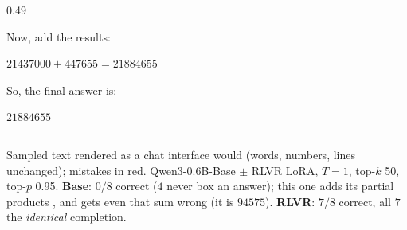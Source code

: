 \begin{frame}
\begin{columns}[T]
\begin{column}{0.49\linewidth}
\begin{block}{}
    \par
    Now, add the results:\par
    \par
    {\centering $21437000 + 447655 = 21884655$\par}
    \par
    So, the final answer is:\par
    \par
    {\centering $\boxed{21884655}$\par}
    \end{block}
    \end{column}
    \end{columns}

    \vspace{0.05cm}
    \raggedright
    \tiny
    Sampled text rendered as a chat interface would (words, numbers, lines unchanged); mistakes in red. Qwen3-0.6B-Base $\pm$ RLVR LoRA, $T{=}1$, top-$k$ 50, top-$p$ 0.95.
    \textbf{Base}: $0/8$ correct ($4$ never box an answer); this one adds its partial products , and gets even that sum wrong (it is $94575$). \textbf{RLVR}: $7/8$ correct, all $7$ the \textit{identical} completion.
\end{frame}




